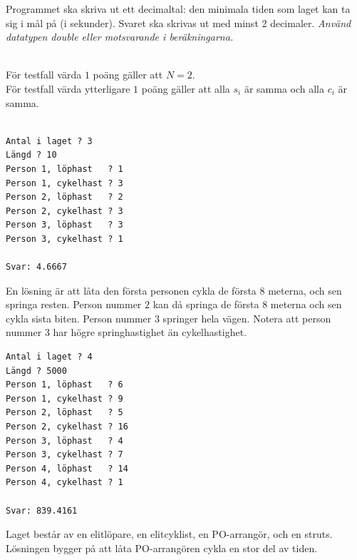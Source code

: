 Programmet ska skriva ut ett decimaltal: den minimala tiden som laget kan ta sig i mål på (i sekunder).
Svaret ska skrivas ut med minst 2 decimaler. {\em Använd datatypen double eller motsvarande i beräkningarna.}

\\
För testfall värda $1$ poäng gäller att $N=2$. \\
För testfall värda ytterligare $1$ poäng gäller att alla $s_i$ är samma och alla $c_i$ är samma.\\

\begin{multicols}{2}
\begin{verbatim}

Antal i laget ? 3
Längd ? 10
Person 1, löphast   ? 1
Person 1, cykelhast ? 3
Person 2, löphast   ? 2
Person 2, cykelhast ? 3
Person 3, löphast   ? 3
Person 3, cykelhast ? 1

Svar: 4.6667
\end{verbatim}
 En lösning är att låta den första personen cykla de första $8$ meterna, och sen springa resten. Person nummer $2$
kan då springa de första $8$ meterna och sen cykla sista biten. Person nummer $3$ springer hela vägen. Notera att person nummer $3$ har
högre springhastighet än cykelhastighet.
\vfill\columnbreak
{}
\begin{verbatim}
Antal i laget ? 4
Längd ? 5000
Person 1, löphast   ? 6
Person 1, cykelhast ? 9
Person 2, löphast   ? 5
Person 2, cykelhast ? 16
Person 3, löphast   ? 4
Person 3, cykelhast ? 7
Person 4, löphast   ? 14
Person 4, cykelhast ? 1

Svar: 839.4161
\end{verbatim}
 Laget består av en elitlöpare, en elitcyklist, en PO-arrangör, och en struts. Lösningen bygger på att låta PO-arrangören
cykla en stor del av tiden.
\vfill
\end{multicols}




